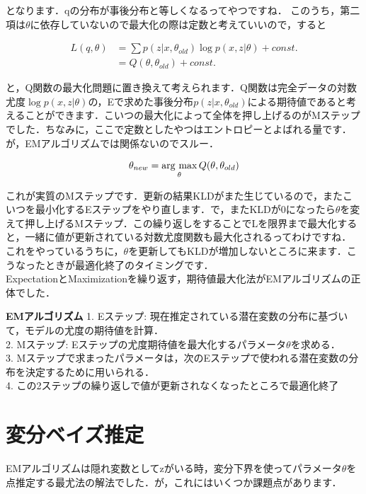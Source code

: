 \documentclass[11pt,a4paper,dvipdfmx]{ujreport}
\newcommand{\argmax}{\mathop{\rm arg~max}\limits}
\begin{document}
となります．qの分布が事後分布と等しくなるってやつですね．
このうち，第二項は$\theta$に依存していないので最大化の際は定数と考えていいので，すると

\begin{align}
  L(q,\theta) &= \sum p(z|x,\theta_{old})\log p(x,z|\theta) + const.\\
  &= Q(\theta, \theta_{old}) + const.
\end{align}

と，Q関数の最大化問題に置き換えて考えられます．Q関数は完全データの対数尤度$\log p(x,z|\theta)$の，Eで求めた事後分布$p(z|x,\theta_{old})$による期待値であると考えることができます．こいつの最大化によって全体を押し上げるのがMステップでした．ちなみに，ここで定数としたやつはエントロピーとよばれる量です．が，EMアルゴリズムでは関係ないのでスルー．

\begin{align}
  \theta_{new} = \argmax_{\theta}Q(\theta,\theta_{old})
\end{align}

これが実質のMステップです．更新の結果KLDがまた生じているので，またこいつを最小化するEステップをやり直します．で，またKLDが0になったら$\theta$を変えて押し上げるMステップ．この繰り返しをすることでLを限界まで最大化すると，一緒に値が更新されている対数尤度関数も最大化されるってわけですね．\\

これをやっているうちに，$\theta$を更新してもKLDが増加しないところに来ます．こうなったときが最適化終了のタイミングです．\\
ExpectationとMaximizationを繰り返す，期待値最大化法がEMアルゴリズムの正体でした．

\begin{screen}
  \textbf{EMアルゴリズム}
  1. Eステップ: 現在推定されている潜在変数の分布に基づいて，モデルの尤度の期待値を計算．\\
  2. Mステップ: Eステップの尤度期待値を最大化するパラメータ$\theta$を求める．\\
  3. Mステップで求まったパラメータは，次のEステップで使われる潜在変数の分布を決定するために用いられる．\\
  4. この2ステップの繰り返しで値が更新されなくなったところで最適化終了
\end{screen}

\section{変分ベイズ推定}
EMアルゴリズムは隠れ変数としてzがいる時，変分下界を使ってパラメータ$\theta$を点推定する最尤法の解法でした．が，これにはいくつか課題点があります．
\end{document}
